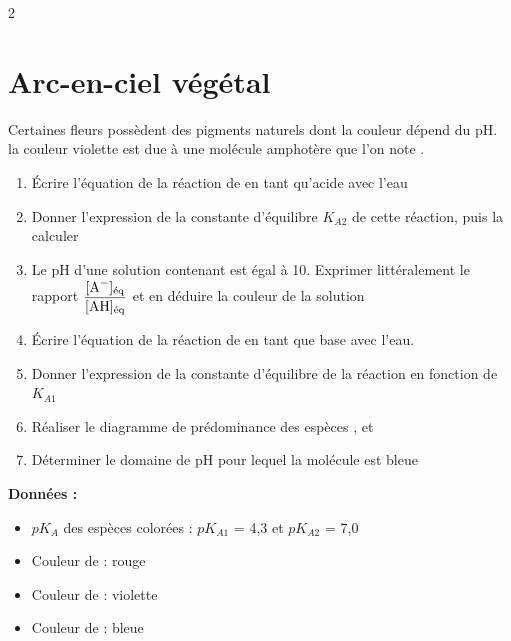 \documentclass[a4paper,11pt,fleqn]{article}%
\begin{document}
\begin{multicols}{2}
\section{Arc-en-ciel végétal}
Certaines fleurs possèdent des pigments naturels dont la couleur dépend du pH. la couleur violette est due à une molécule amphotère que l'on note .
\begin{enumerate}
	\item Écrire l'équation de la réaction de  en tant qu'acide avec l'eau
	\item Donner l'expression de la constante d'équilibre $K_{A2}$ de cette réaction, puis la calculer
	\item Le pH d'une solution contenant  est égal à 10. Exprimer littéralement le rapport $\dfrac{[\ce{A-}]_{\text{éq}}}{[\ce{AH}]_{\text{éq}}}$ et en déduire la couleur de la solution
	\item Écrire l'équation de la réaction de  en tant que base avec l'eau.
	\item Donner l'expression de la constante d'équilibre de la réaction en fonction de $K_{A1}$
	\item Réaliser le diagramme de prédominance des espèces ,  et 
	\item Déterminer le domaine de pH pour lequel la molécule est bleue
\end{enumerate}
\textbf{Données :}
\begin{itemize}
	\item $pK_A$ des espèces colorées : $pK_{A1}$ = 4,3 et $pK_{A2}$ = 7,0
	\item Couleur de  : rouge
	\item Couleur de  : violette
	\item Couleur de  : bleue
\end{itemize}


\end{multicols}
\end{document}
